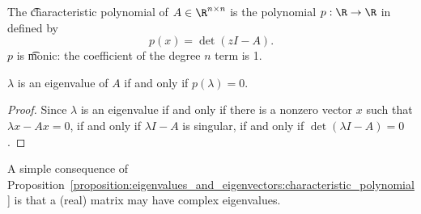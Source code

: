 The \t{characteristic polynomial} of $A \in \R^{n \times n}$ is the polynomial $p: \R \to \R$ in  defined by
\[
	p(x) = \det (zI - A).
\]
$p$ is \t{monic}: the coefficient of the degree $n$ term is 1.
\begin{proposition}
	$\lambda$ is an eigenvalue of $A$ if and only if $p(\lambda) = 0$.
	\begin{proof}
		Since $\lambda$ is an eigenvalue if and only if there is a nonzero vector $x$ such that $\lambda x - Ax = 0$, if and only if $\lambda I - A$ is singular, if and only if $\det(\lambda I - A) = 0$.
	\end{proof}
	\label{proposition:eigenvalues_and_eigenvectors:characteristic_polynomial}
\end{proposition}
A simple consequence of Proposition~\ref{proposition:eigenvalues_and_eigenvectors:characteristic_polynomial} is that  a (real) matrix may have complex eigenvalues.
